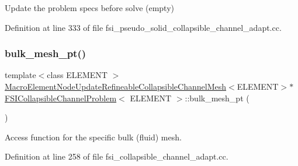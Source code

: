Update the problem specs before solve (empty) 



Definition at line 333 of file fsi\+\_\+pseudo\+\_\+solid\+\_\+collapsible\+\_\+channel\+\_\+adapt.\+cc.

\mbox{\label{classFSICollapsibleChannelProblem_a6c031288ea229296c10e5f41c7b3e99e}} 
\subsubsection{\texorpdfstring{bulk\+\_\+mesh\+\_\+pt()}{bulk\_mesh\_pt()}\hspace{0.1cm}{\footnotesize\ttfamily [1/6]}}
{\footnotesize\ttfamily template$<$class E\+L\+E\+M\+E\+NT $>$ \\
\hyperlink{classoomph_1_1MacroElementNodeUpdateRefineableCollapsibleChannelMesh}{Macro\+Element\+Node\+Update\+Refineable\+Collapsible\+Channel\+Mesh}$<$E\+L\+E\+M\+E\+NT$>$$\ast$ \hyperlink{classFSICollapsibleChannelProblem}{F\+S\+I\+Collapsible\+Channel\+Problem}$<$ E\+L\+E\+M\+E\+NT $>$\+::bulk\+\_\+mesh\+\_\+pt (\begin{DoxyParamCaption}{ }\end{DoxyParamCaption})\hspace{0.3cm}{\ttfamily [inline]}}



Access function for the specific bulk (fluid) mesh. 



Definition at line 258 of file fsi\+\_\+collapsible\+\_\+channel\+\_\+adapt.\+cc.

\mbox{\label{classFSICollapsibleChannelProblem_a5ea2780b4f97b65b5c122a952093e6c2}} 
